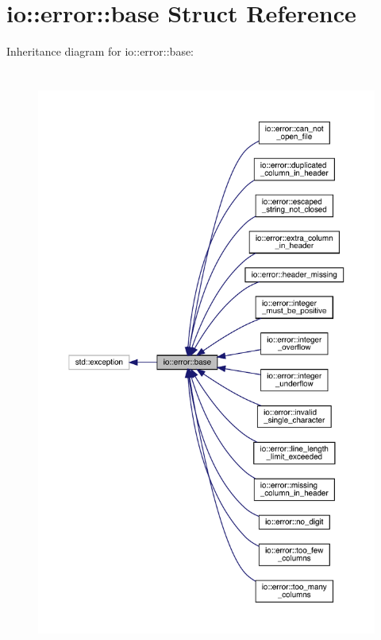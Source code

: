 \hypertarget{structio_1_1error_1_1base}{}\section{io\+:\+:error\+:\+:base Struct Reference}
\label{structio_1_1error_1_1base}


Inheritance diagram for io\+:\+:error\+:\+:base\+:\nopagebreak
\begin{figure}[H]
\begin{center}
\leavevmode
\includegraphics[height=550pt]{structio_1_1error_1_1base__inherit__graph}
\end{center}
\end{figure}


